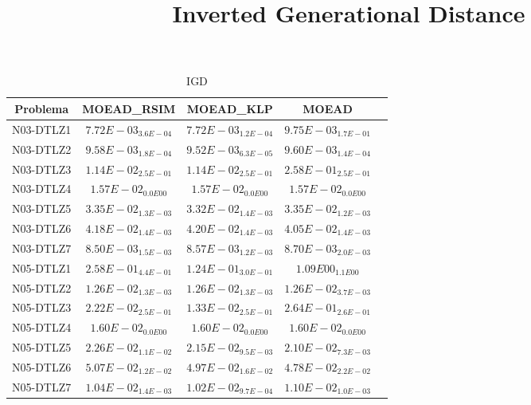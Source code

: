 \documentclass{article}
\title{Inverted Generational Distance}
\author{}
\begin{document}
\maketitle
\begin{table*}[ht!]
\scriptsize
\caption{IGD}
\centering\begin{tabular}{|c||c||c||c||c|} \hline
Problema &MOEAD_RSIM &MOEAD_KLP &MOEAD\\\hline
N03-DTLZ1 &\cellcolor{gray25}$7.72E-03_{3.6E-04}$ &\cellcolor{gray95}$7.72E-03_{1.2E-04}$ &$9.75E-03_{1.7E-01}$\\ 
\hline
N03-DTLZ2 &\cellcolor{gray25}$9.58E-03_{1.8E-04}$ &\cellcolor{gray95}$9.52E-03_{6.3E-05}$ &$9.60E-03_{1.4E-04}$\\ 
\hline
N03-DTLZ3 &\cellcolor{gray95}$1.14E-02_{2.5E-01}$ &\cellcolor{gray25}$1.14E-02_{2.5E-01}$ &$2.58E-01_{2.5E-01}$\\ 
\hline
N03-DTLZ4 &\cellcolor{gray95}$1.57E-02_{0.0E00}$ &\cellcolor{gray25}$1.57E-02_{0.0E00}$ &$1.57E-02_{0.0E00}$\\ 
\hline
N03-DTLZ5 &\cellcolor{gray25}$3.35E-02_{1.3E-03}$ &\cellcolor{gray95}$3.32E-02_{1.4E-03}$ &$3.35E-02_{1.2E-03}$\\ 
\hline
N03-DTLZ6 &\cellcolor{gray25}$4.18E-02_{1.4E-03}$ &$4.20E-02_{1.4E-03}$ &\cellcolor{gray95}$4.05E-02_{1.4E-03}$\\ 
\hline
N03-DTLZ7 &\cellcolor{gray95}$8.50E-03_{1.5E-03}$ &\cellcolor{gray25}$8.57E-03_{1.2E-03}$ &$8.70E-03_{2.0E-03}$\\ 
\hline
N05-DTLZ1 &\cellcolor{gray25}$2.58E-01_{4.4E-01}$ &\cellcolor{gray95}$1.24E-01_{3.0E-01}$ &$1.09E00_{1.1E00}$\\ 
\hline
N05-DTLZ2 &\cellcolor{gray95}$1.26E-02_{1.3E-03}$ &\cellcolor{gray25}$1.26E-02_{1.3E-03}$ &$1.26E-02_{3.7E-03}$\\ 
\hline
N05-DTLZ3 &\cellcolor{gray25}$2.22E-02_{2.5E-01}$ &\cellcolor{gray95}$1.33E-02_{2.5E-01}$ &$2.64E-01_{2.6E-01}$\\ 
\hline
N05-DTLZ4 &\cellcolor{gray95}$1.60E-02_{0.0E00}$ &\cellcolor{gray25}$1.60E-02_{0.0E00}$ &$1.60E-02_{0.0E00}$\\ 
\hline
N05-DTLZ5 &$2.26E-02_{1.1E-02}$ &\cellcolor{gray25}$2.15E-02_{9.5E-03}$ &\cellcolor{gray95}$2.10E-02_{7.3E-03}$\\ 
\hline
N05-DTLZ6 &$5.07E-02_{1.2E-02}$ &\cellcolor{gray25}$4.97E-02_{1.6E-02}$ &\cellcolor{gray95}$4.78E-02_{2.2E-02}$\\ 
\hline
N05-DTLZ7 &\cellcolor{gray25}$1.04E-02_{1.4E-03}$ &\cellcolor{gray95}$1.02E-02_{9.7E-04}$ &$1.10E-02_{1.0E-03}$\\ 

\end{tabular}
\end{table*}
\end{document}

